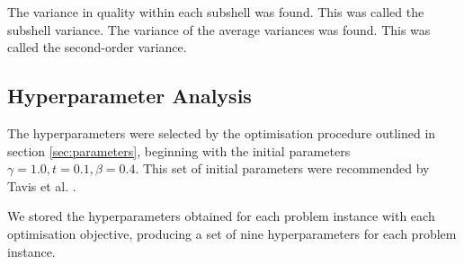 The variance in quality within each subshell was found. This was called the subshell variance. The variance of the average variances was found. This was called the second-order variance.

    \subsection{Hyperparameter Analysis}
The hyperparameters were selected by the optimisation procedure outlined in section \ref{sec:parameters}, beginning with the initial parameters $\gamma=1.0, t=0.1, \beta=0.4$. This set of initial parameters were recommended by Tavis et al. \cite{bennett2024nonvariational}.

We stored the hyperparameters obtained for each problem instance with each optimisation objective, producing a set of nine hyperparameters for each problem instance.